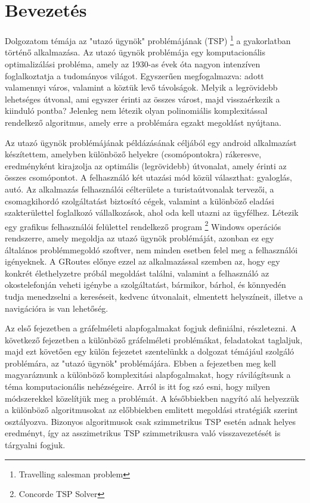 \chapter{Bevezetés}

Dolgozatom témája az "utazó ügynök" problémájának (TSP)%
\footnote{ %
	Travelling salesman problem
}  %
 a gyakorlatban történő alkalmazása. Az utazó ügynök problémája egy komputacionális optimalizálási probléma, amely az 1930-as évek óta nagyon intenzíven foglalkoztatja a tudományos világot. Egyszerűen megfogalmazva: adott valamennyi város, valamint a köztük levő távolságok. Melyik a legrövidebb lehetséges útvonal, ami egyszer érinti az összes várost, majd visszaérkezik a kiinduló pontba? Jelenleg nem létezik olyan polinomiális komplexitással rendelkező algoritmus, amely erre a problémára egzakt megoldást nyújtana.

Az utazó ügynök problémájának példázásának céljából egy android alkalmazást készítettem, amelyben különböző helyekre (csomópontokra) rákeresve, eredményként kirajzolja az optimális (legrövidebb) útvonalat, amely érinti az összes csomópontot. A felhasználó két utazási mód közül választhat: gyaloglás, autó. Az alkalmazás felhasználói célterülete a turistaútvonalak tervezői, a csomagkihordó szolgáltatást biztosító cégek, valamint a különböző eladási szakterülettel foglalkozó vállalkozások, ahol oda kell utazni az ügyfélhez. Létezik egy grafikus felhasználói felülettel rendelkező program%
\footnote{ %
	Concorde TSP Solver
}  %
 Windows operációs rendszerre, amely megoldja az utazó ügynök problémáját, azonban ez egy általános problémmegoldó szoftver, nem minden esetben felel meg a felhasználói igényeknek. A GRoutes előnye ezzel az alkalmazással szemben az, hogy egy konkrét élethelyzetre próbál megoldást találni, valamint a felhasználó az okostelefonján veheti igénybe a szolgáltatást, bármikor, bárhol, és könnyedén tudja menedzselni a kereséseit, kedvenc útvonalait, elmentett helyszíneit, illetve a navigációra is van lehetőség.

Az első fejezetben a gráfelméleti alapfogalmakat fogjuk definiálni, részletezni. A következő fejezetben a különböző gráfelméleti problémákat, feladatokat taglaljuk, majd ezt követően egy külön fejezetet szentelünkk a dolgozat témájául szolgáló problémára, az "utazó ügynök" problémájára. Ebben a fejezetben meg kell magyaráznunk a különböző komplexitási alapfogalmakat, hogy rávilágítsunk a téma komputacionális nehézségeire. Arról is itt fog szó esni, hogy milyen módszerekkel közelítjük meg a problémát. A későbbiekben nagyító alá helyezzük a különböző algoritmusokat az előbbiekben emlitett megoldási stratégiák szerint osztályozva. Bizonyos algoritmusok csak szimmetrikus TSP esetén adnak helyes eredményt, így az asszimetrikus TSP szimmetrikusra való visszavezetését is tárgyalni fogjuk.

